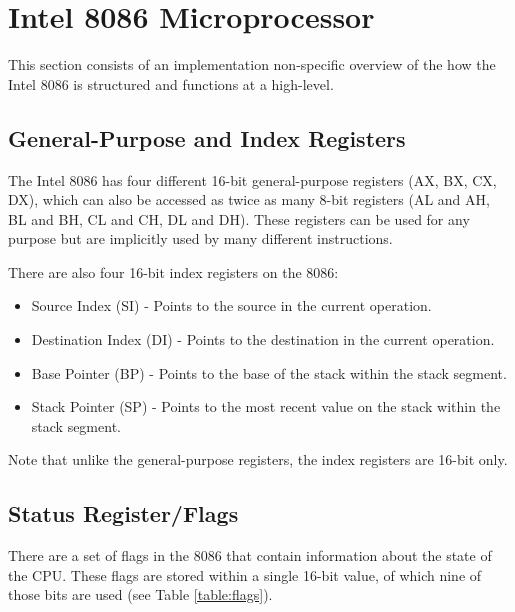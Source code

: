 \section{Intel 8086 Microprocessor}

This section consists of an implementation non-specific overview of the how the Intel 8086 is structured and functions at a high-level.

\subsection{General-Purpose and Index Registers}
	The Intel 8086 has four different 16-bit general-purpose registers (AX, BX, CX, DX), which can also be accessed as twice as many 8-bit registers (AL and AH, BL and BH, CL and CH, DL and DH). These registers can be used for any purpose but are implicitly used by many different instructions.

	There are also four 16-bit index registers on the 8086:
	\begin{itemize}
		\item Source Index (SI) - Points to the source in the current operation.
		\item Destination Index (DI) - Points to the destination in the current operation.
		\item Base Pointer (BP) - Points to the base of the stack within the stack segment.
		\item Stack Pointer (SP) - Points to the most recent value on the stack within the stack segment.
	\end{itemize}
	Note that unlike the general-purpose registers, the index registers are 16-bit only.

\subsection{Status Register/Flags}
	There are a set of flags in the 8086 that contain information about the state of the CPU. These flags are stored within a single 16-bit value, of which nine of those bits are used (see Table \ref{table:flags}).

